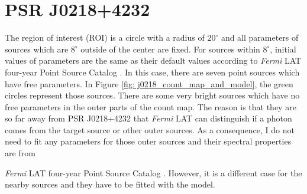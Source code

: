 \documentclass[a4paper, 12pt]{report}
\newcommand{\fgl}[0]{
  \textit{Fermi} LAT four-year Point Source Catalog
}
\begin{document}
      \begin{table}[!ht]
        \centering
        \caption[Fit results with data from year 2009 to year 2018.]
          {Fit results with data from year 2009 to year 2018. The physical 
          meanings of $\Gamma$ and $E_c$ are the same as Table 
          \ref{table: previous_result_comparison}}
        \label{table: 2018_fit_data}
      \end{table}

  \section{PSR J0218+4232}
  
    The region of interest (ROI) is a circle with a radius of $20^\circ$ and all parameters of
    sources which are $8^\circ$ outside of the center are fixed. For sources within 
    $8^\circ$, initial values of parameters are the same as their default values according 
    to \fgl. In this case, there are seven point sources which have free parameters. In 
    Figure \ref{fig: j0218_count_map_and_model}, the green circles represent those sources.
    There are some very bright sources which have no free parameters
    in the outer parts of the count map. The reason is that they are so far away 
    from PSR J0218+4232 that \textit{Fermi} LAT can distinguish if a photon comes 
    from the target source or other outer sources. As a consequence, I do not need to fit 
    any parameters for those outer sources and their spectral properties are from 
    \fgl{}. However, it is a different case for the nearby sources and they have to be fitted
    with the model.
          
\end{document}
